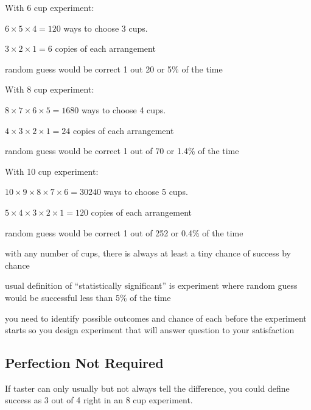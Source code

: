 \documentclass[landscape]{exam}
\begin{document}
  With 6 cup experiment:
  \begin{itemize*}
    \item $6 \times 5 \times 4 = 120$ ways to choose 3 cups.  
    \item $3 \times 2 \times 1 = 6$ copies of each arrangement
    \item random guess would be correct 1 out 20 or 5\% of the time
  \end{itemize*}

  With 8 cup experiment:
  \begin{itemize*}
    \item $8 \times 7 \times 6 \times 5 = 1680$ ways to choose 4 cups.  
    \item $4 \times 3 \times 2 \times 1 = 24$ copies of each arrangement
    \item random guess would be correct 1 out of 70 or 1.4\% of the time
  \end{itemize*}

  With 10 cup experiment:
  \begin{itemize*}
    \item $10 \times 9 \times 8 \times 7 \times 6 = 30240$ ways to choose 5 cups.  
    \item $5 \times 4 \times 3 \times 2 \times 1 = 120$ copies of each arrangement
    \item random guess would be correct 1 out of 252 or 0.4\% of the time
  \end{itemize*}

  \begin{itemize*}
    \item with any number of cups, there is always at least a tiny chance of
      success by chance
    \item usual definition of ``statistically significant'' is experiment where
      random guess would be successful less than 5\% of the time
    \item you need to identify possible outcomes and chance of each before the
      experiment starts so you design experiment that will answer question to
      your satisfaction
  \end{itemize*}

  \subsection{Perfection Not Required}
  If taster can only usually but not always tell the difference, you could
  define success as 3 out of 4 right in an 8 cup experiment.
\end{document}
